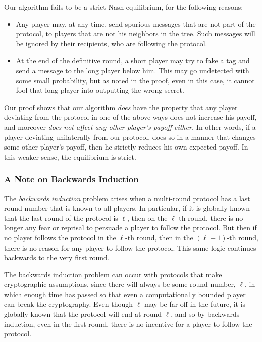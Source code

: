 \documentclass[12pt]{article}
\theoremstyle{definition}
\begin{document}
Our algorithm fails to be a strict Nash equilibrium, for the following 
reasons:
\begin{itemize}
\item Any player may, at any time, send spurious messages that are not 
part of the protocol, to players that are not his neighbors
in the tree. Such messages will be ignored by their recipients, who are 
following the protocol. 
\item At the end of the definitive round, a short player may try to 
fake a tag and send a message to the long player below him. This may 
go undetected with some small probability, but as noted in the proof,
even in this case, it cannot fool that long player into outputting the 
wrong secret.
\end{itemize}
Our proof shows that our algorithm \emph{does} have the property that 
any player deviating from the protocol in one of the above ways does not increase his 
payoff, and moreover \emph{does not 
affect any other player's payoff either.} In other words, if a player 
deviating unilaterally from our protocol, does so in a manner that 
changes some other player's payoff, then he strictly reduces his own 
expected payoff. 
In this weaker sense, the equilibrium is strict. 

\subsubsection{A Note on Backwards Induction}\label{sec:backind}

The \emph{backwards induction} problem arises when a multi-round
protocol has a last round number that is known to all players.  In
particular, if it is globally known that the last round of the
protocol is $\ell$, then on the $\ell$-th round, there is no longer
any fear or reprisal to persuade a player to follow the protocol.  But
then if no player follows the protocol in the $\ell$-th round, then in
the $(\ell - 1)$-th round, there is no reason for any player to follow
the protocol.  This same logic continues backwards to the very first
round.

The backwards induction problem can occur with protocols that make
cryptographic assumptions, since there will always be some round
number, $\ell$, in which enough time has passed so that even a
computationally bounded player can break the cryptography.  Even
though $\ell$ may be far off in the future, it is globally known that
the protocol will end at round $\ell$, and so by backwards induction,
even in the first round, there is no incentive for a player to follow
the protocol.
\end{document}
